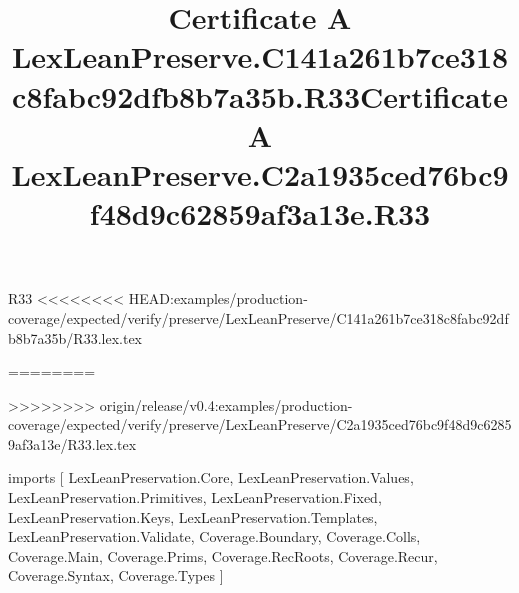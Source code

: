 \begin{lexlean}{R33}
<<<<<<<< HEAD:examples/production-coverage/expected/verify/preserve/LexLeanPreserve/C141a261b7ce318c8fabc92dfb8b7a35b/R33.lex.tex
\title{Certificate A LexLeanPreserve.C141a261b7ce318c8fabc92dfb8b7a35b.R33}
========
\title{Certificate A LexLeanPreserve.C2a1935ced76bc9f48d9c62859af3a13e.R33}
>>>>>>>> origin/release/v0.4:examples/production-coverage/expected/verify/preserve/LexLeanPreserve/C2a1935ced76bc9f48d9c62859af3a13e/R33.lex.tex
\begin{coremodule}
imports [
  LexLeanPreservation.Core,
  LexLeanPreservation.Values,
  LexLeanPreservation.Primitives,
  LexLeanPreservation.Fixed,
  LexLeanPreservation.Keys,
  LexLeanPreservation.Templates,
  LexLeanPreservation.Validate,
  Coverage.Boundary,
  Coverage.Colls,
  Coverage.Main,
  Coverage.Prims,
  Coverage.RecRoots,
  Coverage.Recur,
  Coverage.Syntax,
  Coverage.Types
]


\end{coremodule}
\end{lexlean}

